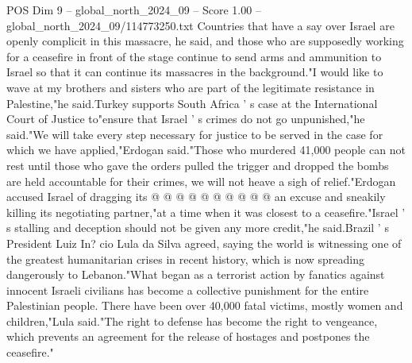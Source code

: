 \begin{textsample}{POS Dim 9 – global\_north\_2024\_09 – Score 1.00 – global\_north\_2024\_09/114773250.txt}
Countries that have a say over Israel are openly complicit in this massacre, he said, and those who are supposedly working for a ceasefire in front of the stage continue to send arms and ammunition to Israel so that it can continue its massacres in the background."I would like to wave at my brothers and sisters who are part of the legitimate resistance in Palestine,"he said.Turkey supports South Africa ' s case at the International Court of Justice to"ensure that Israel ' s crimes do not go unpunished,"he said."We will take every step necessary for justice to be served in the case for which we have applied,"Erdogan said."Those who murdered 41,000 people can not rest until those who gave the orders pulled the trigger and dropped the bombs are held accountable for their crimes, we will not heave a sigh of relief."Erdogan accused Israel of dragging its @ @ @ @ @ @ @ @ @ @ an excuse and sneakily killing its negotiating partner,"at a time when it was closest to a ceasefire."Israel ' s stalling and deception should not be given any more credit,"he said.Brazil ' s President Luiz In? cio Lula da Silva agreed, saying the world is witnessing one of the greatest humanitarian crises in recent history, which is now spreading dangerously to Lebanon."What began as a terrorist action by fanatics against innocent Israeli civilians has become a collective punishment for the entire Palestinian people.
There have been over 40,000 fatal victims, mostly women and children,"Lula said."The right to defense has become the right to vengeance, which prevents an agreement for the release of hostages and postpones the ceasefire."

\end{textsample}
